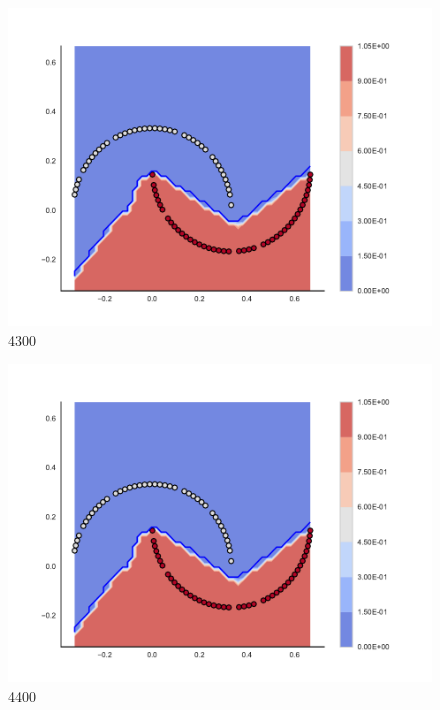 \begin{subfigure}[b]{0.09\textwidth}
    \includegraphics[clip, trim=2.35cm 1.75cm 4.5cm 0cm,width=\textwidth]{img/convergence/4300.pdf}
    \caption{4300}
    \label{fig:convergence_4300}
\end{subfigure}
%
\begin{subfigure}[b]{0.09\textwidth}
    \includegraphics[clip, trim=2.35cm 1.75cm 4.5cm 0cm,width=\textwidth]{img/convergence/4400.pdf}
    \caption{4400}
    \label{fig:convergence_4400}
\end{subfigure}
%
